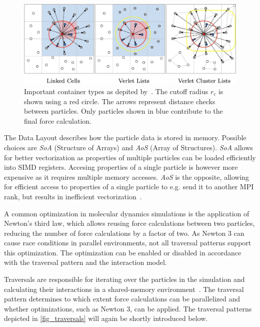 \documentclass[conference]{IEEEtran}
\begin{document}
\begin{description}[style=nextline]
        \begin{figure}[h]
            \centering
            \includegraphics[width=\columnwidth]{figures/containers.jpg}
            \caption{Important container types as depited by~\cite{Gratl2022AutoPas}. The cutoff radius $r_c$ is shown using a red circle. The arrows represent distance checks between particles. Only particles shown in blue contribute to the final force calculation.}
            \label{fig_containers}
        \end{figure}

    \item[Data Layout]
        The Data Layout describes how the particle data is stored in memory. Possible choices are \textit{SoA} (Structure of Arrays) and \textit{AoS} (Array of Structures). \textit{SoA} allows for better vectorization as properties of multiple particles can be loaded efficiently into SIMD registers. Accesing properties of a single particle is however more expensive as it requires multiple memory accesses. \textit{AoS} is the opposite, allowing for efficient access to properties of a single particle to e.g. send it to another MPI rank, but results in inefficient vectorization~\cite{Gratl2022AutoPas}.

    \item[Newton 3]
        A common optimization in molecular dynamics simulations is the application of Newton's third law, which allows reusing force calculations between two particles, reducing the number of force calculations by a factor of two. As Newton 3 can cause race conditions in parallel environments, not all traversal patterns support this optimization. The optimization can be enabled or disabled in accordance with the traversal pattern and the interaction model.

    \item[Traversal]
        Traversals are responsible for iterating over the particles in the simulation and calculating their interactions in a shared-memory environment~\cite{SECKLER2021101296}. The traversal pattern determines to which extent force calculations can be parallelized and whether optimizations, such as Newton 3, can be applied. The traversal patterns depicted in \autoref{fig_traversals} will again be shortly introduced below.


\end{description}
\end{document}
